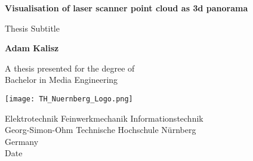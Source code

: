 \begin{titlepage}
	\begin{center}
		\vspace*{1cm}
		
		\Huge
		\textbf{Visualisation of laser scanner point cloud as 3d panorama}
		
		\vspace{0.5cm}
		\LARGE
		Thesis Subtitle
		
		\vspace{1.5cm}
		
		\textbf{Adam Kalisz}
		
		\vfill
		
		A thesis presented for the degree of\\
		Bachelor in Media Engineering
		
		\vspace{0.8cm}
		
		{\texttt{[image: TH\_Nuernberg\_Logo.png]}}
		
		\Large
		Elektrotechnik Feinwerkmechanik Informationstechnik\\
		Georg-Simon-Ohm Technische Hochschule Nürnberg\\
		Germany\\
		Date
		
		
		
	\end{center}
\end{titlepage}